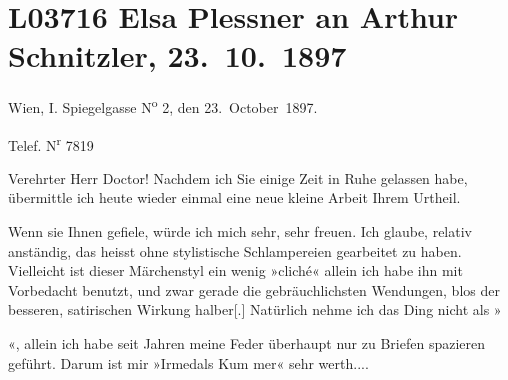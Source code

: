 

\section[Elsa Plessner an Arthur Schnitzler, 23. 10. 1897]{L03716 Elsa Plessner an Arthur Schnitzler, 23. 10. 1897}
\nopagebreak{}
\rehead{ }\normalsize\beginnumbering{}
\toendnotes[C]{\smallbreak\pagebreak[2]}
\toendnotes[C]{\smallbreak}
\pstart
           {\pb} Wien, I. Spiegelgasse N\textsuperscript{o} 2, den 23. October 1897.\pend
           
\pstart
           \raggedleft{}Telef. N\textsuperscript{r} 7819\pend
           
\pstart\center{}Verehrter Herr Doctor!\pend\vspace{0.5em}
\pstart
           Nachdem ich Sie einige Zeit in Ruhe gelassen habe, übermittle ich heute wieder einmal
               eine neue kleine Arbeit Ihrem
               Urtheil. \pend
           
\pstart
           Wenn sie Ihnen gefiele, würde ich mich sehr, sehr freuen. Ich glaube, relativ
               anständig, das heisst ohne stylistische Schlampereien gearbeitet zu haben. Vielleicht
               ist dieser Märchenstyl ein wenig »cliché« allein ich habe ihn mit Vorbedacht benutzt,
               und zwar gerade die gebräuchlichsten Wendungen, blos  der besseren, satirischen Wirkung halber{[}.{]}
               Natürlich nehme ich das Ding
               nicht als »\begin{otherlanguage}{french}\label{K_L03716-1v}\label{K_L03716-1}{ }\end{otherlanguage}«, allein ich habe seit  Jahren meine
               Feder überhaupt nur zu Briefen spazieren geführt. Darum ist mir »Irmedals Kum {\pb}mer« sehr werth....\pend
           
